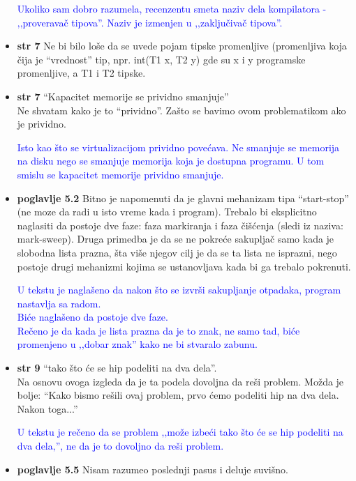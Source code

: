 \documentclass[a4paper]{report}
\newcommand{\odgovor}[1]{\textcolor{blue}{#1}}
\begin{document}
\begin{itemize}
\odgovor{Ukoliko sam dobro razumela, recenzentu smeta naziv dela kompilatora - ‚‚proveravač tipova''. Naziv je izmenjen u ‚‚zaključivač tipova''.}

\item \textbf{str 7} Ne bi bilo loše da se uvede pojam tipske promenljive (promenljiva koja čija je ``vrednost'' tip, npr. int(T1 x, T2 y) gde su x i y programske promenljive, a T1 i T2 tipske.

\item \textbf{str 7} ``Kapacitet memorije se prividno smanjuje'' \\ Ne shvatam kako je to ``prividno''. Zašto se bavimo ovom problematikom ako je prividno. 

\odgovor{Isto kao što se virtualizacijom prividno povećava. Ne smanjuje se memorija na disku nego se smanjuje memorija koja je dostupna programu. U tom smislu se kapacitet memorije prividno smanjuje.}

\item \textbf{poglavlje 5.2} Bitno je napomenuti da je glavni mehanizam tipa ``start-stop'' (ne moze da radi u isto vreme kada i program). Trebalo bi eksplicitno naglasiti da postoje dve faze: faza markiranja i faza čišćenja (sledi iz naziva: mark-sweep). Druga primedba je da se ne pokreće sakupljač samo kada je slobodna lista prazna, šta više njegov cilj je da se ta lista ne isprazni, nego postoje drugi mehanizmi kojima se ustanovljava kada bi ga trebalo pokrenuti.

\odgovor{U tekstu je naglašeno da nakon što se izvrši sakupljanje otpadaka, program nastavlja sa radom.\\
Biće naglašeno da postoje dve faze. \\
Rečeno je da kada je lista prazna da je to znak, ne samo tad, biće promenjeno u ‚‚dobar znak'' kako ne bi stvaralo zabunu.}

\item \textbf{str 9} ``tako što će se hip podeliti na dva dela''. \\ Na osnovu ovoga izgleda da je ta podela dovoljna da reši problem. Možda je bolje: ``Kako bismo rešili ovaj problem, prvo ćemo podeliti hip na dva dela. Nakon toga...''

\odgovor{U tekstu je rečeno da se problem ‚‚može izbeći tako što će se hip podeliti na dva dela‚'', ne da je to dovoljno da reši problem.}

\item \textbf{poglavlje 5.5} Nisam razumeo poslednji pasus i deluje suvišno.


\end{itemize}
\end{document}
